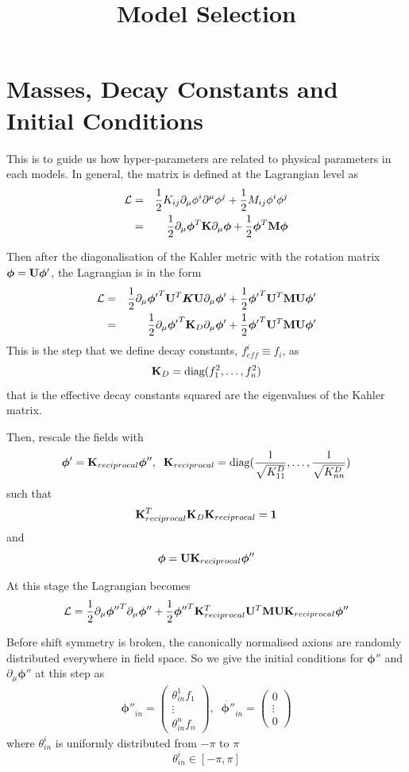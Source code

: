 \documentclass[12pt]{article}
\title{Model Selection}
\author{}
\date{} %
\newcommand{\beq}{\begin{equation}}
\newcommand{\eeq}{\end{equation}}
\newcommand{\beqa}{\begin{eqnarray}}
\newcommand{\eeqa}{\end{eqnarray}}
\begin{document}
\maketitle

\section{Masses, Decay Constants and Initial Conditions}

This is to guide us how hyper-parameters are related to physical parameters in each models. 
In general, the matrix is defined at the Lagrangian level as
\beqa
\mathcal{L} & = & {1\over 2} K_{ij} \partial_{\mu} \phi^i \partial^{\mu} \phi^j + {1\over 2} M_{ij} \phi^i\phi^j \\
& = & {1\over 2} \partial_{\mu} {\bm \phi}^T {\bf K} \partial_{\mu} {\bm \phi} + {1\over 2} {\bm \phi}^T {\bf M} {\bm \phi} 
\eeqa

Then after the diagonalisation of the Kahler metric with the rotation matrix ${\bm \phi} =  {\bf U} {\bm \phi'}$, the Lagrangian is in the form
\beqa
\mathcal{L} &=& {1\over 2} \partial_{\mu} {\bm \phi'}^T {\bf U}^T {\bm K} {\bf U} \partial_{\mu} {\bm \phi'} + {1\over 2} {\bm \phi'}^T {\bf U}^T {\bf M}  {\bf U} {\bm \phi'} \\
&=& {1\over 2} \partial_{\mu} {\bm \phi'}^T {\bf K}_D \partial_{\mu} {\bm \phi'} + {1\over 2} {\bm \phi'}^T {\bf U}^T {\bf M}  {\bf U} {\bm \phi'}
\eeqa
This is the step that we define decay constants, $f_{eff}^i \equiv f_i$, as
\beq
{\bf K}_D = \text{diag}(f_{1}^2, \ldots, f_{n}^2)
\eeq
that is the effective decay constants squared are the eigenvalues of the Kahler matrix.

Then, rescale the fields with
\beq
{\bm \phi'} = {\bf K}_{reciprocal} {\bm \phi''},\;\; {\bf K}_{reciprocal} = \text{diag}({1\over \sqrt{K^D_{11}}}, \ldots,  {1\over \sqrt{K^D_{nn}}})
\eeq
such that
\beq
{\bf K}_{reciprocal}^T {\bf K}_D {\bf K}_{reciprocal} = \bf 1
\eeq
and
\beq
{\bm \phi} =  {\bf U} {\bf K}_{reciprocal} {\bm \phi''}
\eeq

At this stage the Lagrangian becomes
\beq
\mathcal{L} = {1\over 2} \partial_{\mu} {\bm \phi''}^T \partial_{\mu} {\bm \phi''} + {1\over 2} {\bm \phi''}^T {\bf K}_{reciprocal}^T {\bf U}^T {\bf M}  {\bf U} {\bf K}_{reciprocal}{\bm \phi''}
\eeq

Before shift symmetry is broken, the canonically normalised axions are randomly distributed everywhere in field space. So we give the initial conditions for ${\bm \phi''}$ and $\partial_{\mu} {\bm \phi''}$ at this step as
\beqa
{\bm \phi''}_{in} = \begin{pmatrix} \theta_{in}^1 f_1 \\ \vdots \\ \theta_{in}^n f_n \end{pmatrix},\;\; \dot{\bm \phi''}_{in} =\begin{pmatrix} 0 \\ \vdots \\ 0 \end{pmatrix}
\eeqa
where $\theta^i_{in}$ is uniformly distributed from $-\pi$ to $\pi$
\beq
\theta^i_{in} \in [-\pi, \pi]
\eeq
\end{document}
